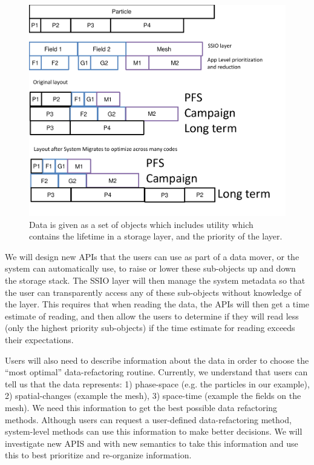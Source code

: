 \begin{figure}
        \begin{centering} 
	\includegraphics[scale=0.77]{graphics/SSIO-bucket.pdf}
        \caption{Data is given as a set of objects which includes utility which contains the lifetime in a storage layer, and the priority of the layer.}
        \label{fig:ssio-bucket}
        \end{centering}
\end{figure}


We will design new APIs that the users can use as part of a data mover, or the system can automatically use, to raise or lower these sub-objects
up and down the storage stack. The SSIO layer will then manage the system metadata so that the user can transparently access any of these
sub-objects without knowledge of the layer. This requires that when reading the data, the APIs will then get a time estimate of reading, and then
allow the users to determine if they will read less (only the highest priority sub-objects) if the time estimate for reading exceeds their expectations.
%

Users will also need to describe information about the data in order to choose the ``most optimal'' data-refactoring routine. Currently, we understand
that users can tell us that the data represents: 1) phase-space (e.g. the particles in our example), 2) spatial-changes (example the mesh), 3) space-time
(example the fields on the mesh). We need this information to get the best possible data refactoring methods. Although users can request 
a user-defined data-refactoring method, system-level methods can use this information to make better decisions. We will investigate new APIS 
and with new semantics to take this information and use this to best prioritize and re-organize information.

